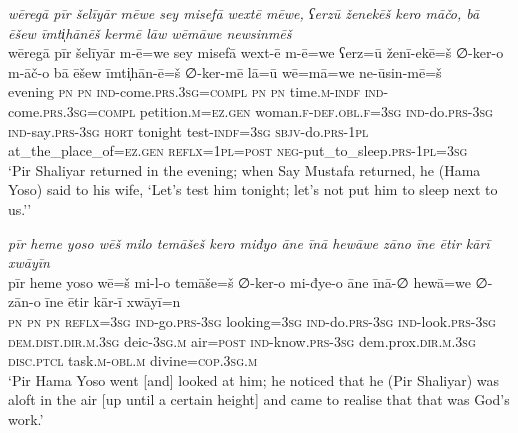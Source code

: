 \ea \label{ŽP.62}
\textit{wēregā pīr šelīyār mēwe sey misefā wextē mēwe, ʕerzū ženekēš kero māčo, bā ēšew īmti̩hānēš kermē lāw wēmāwe newsinmēš} \\ 
\gll wēregā pīr šelīyār m-ē=we sey misefā wext-ē m-ē=we ʕerz=ū ženī-ekē=š ∅-ker-o m-āč-o bā ēšew īmti̩hān-ē=š ∅-ker-mē lā=ū wē=mā=we ne-ūsin-mē=š \\ 
 evening \textsc{pn} \textsc{pn} \textsc{ind-}come\textsc{.prs}\textsc{.3sg}\textsc{=compl} \textsc{pn} \textsc{pn} time\textsc{.m}\textsc{-indf} \textsc{ind-}come\textsc{.prs}\textsc{.3sg}\textsc{=compl} petition\textsc{.m}\textsc{\textsc{=ez.gen}} woman\textsc{.f}\textsc{-def}\textsc{.obl}\textsc{.f}\textsc{=3sg} \textsc{ind-}do\textsc{.prs}\textsc{-3sg} \textsc{ind-}say\textsc{.prs}\textsc{-3sg} \textsc{hort} tonight test\textsc{-indf}\textsc{=3sg} \textsc{sbjv-}do\textsc{.prs}\textsc{-1pl} at\_the\_place\_of\textsc{\textsc{=ez.gen}} \textsc{reflx}\textsc{=1pl}\textsc{=\textsc{post}} \textsc{neg-}put\_to\_sleep\textsc{.prs}\textsc{-1pl}\textsc{=3sg} \\ 
\glt `Pir Shaliyar returned in the evening; when Say Mustafa returned, he (Hama Yoso) said to his wife, ‘Let’s test him tonight; let’s not put him to sleep next to us.’'
\z 
 
\ea \label{ŽP.71}
\textit{pīr heme yoso wēš milo temāšeš kero miđyo āne īnā hewāwe zāno īne ētir kārī xwāyīn} \\ 
\gll pīr heme yoso wē=š mi-l-o temāše=š ∅-ker-o mi-đye-o āne īnā-∅ hewā=we ∅-zān-o īne ētir kār-ī xwāyī=n \\ 
 \textsc{pn} \textsc{pn} \textsc{pn} \textsc{reflx}\textsc{=3sg} \textsc{ind-}go\textsc{.prs}\textsc{-3sg} looking\textsc{=3sg} \textsc{ind-}do\textsc{.prs}\textsc{-3sg} \textsc{ind-}look\textsc{.prs}\textsc{-3sg} \textsc{dem.dist}\textsc{.dir}\textsc{.m}\textsc{.3sg} deic\textsc{-3sg}\textsc{.m} air\textsc{=\textsc{post}} \textsc{ind-}know\textsc{.prs}\textsc{-3sg} dem.prox\textsc{.dir}\textsc{.m}\textsc{.3sg} \textsc{disc.ptcl} task\textsc{.m}\textsc{-obl}\textsc{.m} divine\textsc{=cop}\textsc{.3sg}\textsc{.m} \\ 
\glt `Pir Hama Yoso went [and] looked at him; he noticed that he (Pir Shaliyar) was aloft in the air [up until a certain height] and came to realise that that was God’s work.'
\z 
 
